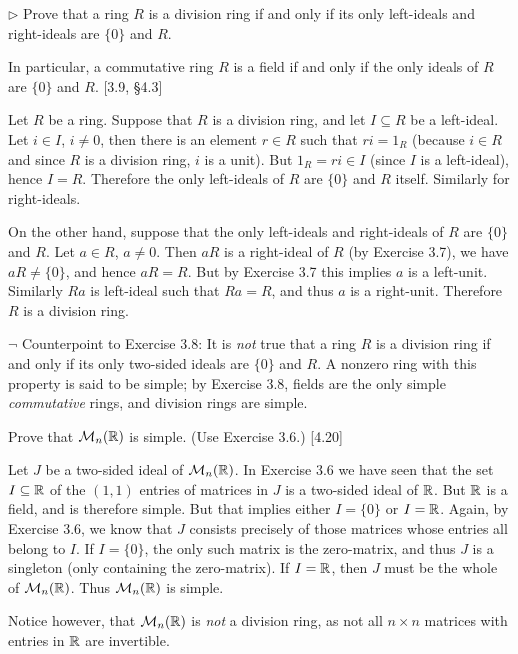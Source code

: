 \begin{problem}
	$\triangleright$ Prove that a ring $R$ is a division ring if and only if its only left-ideals and right-ideals are $\{0\}$ and $R$.
	
	In particular, a commutative ring $R$ is a field if and only if the only ideals of $R$ are $\{0\}$ and $R$. [3.9, \S 4.3]
\end{problem}

\begin{solution}
	Let $R$ be a ring. Suppose that $R$ is a division ring, and let $I \subseteq R$ be a left-ideal. Let $i \in I$, $i \neq 0$, then there is an element $r \in R$ such that $ri = 1_R$ (because $i \in R$ and since $R$ is a division ring, $i$ is a unit). But $1_R = ri \in I$ (since $I$ is a left-ideal), hence $I = R$. Therefore the only left-ideals of $R$ are $\{0\}$ and $R$ itself. Similarly for right-ideals.
	
	On the other hand, suppose that the only left-ideals and right-ideals of $R$ are $\{0\}$ and $R$. Let $a \in R$, $a \neq 0$. Then $aR$ is a right-ideal of $R$ (by Exercise 3.7), we have $aR \neq \{0\}$, and hence $aR = R$. But by Exercise 3.7 this implies $a$ is a left-unit. Similarly $Ra$ is left-ideal such that $Ra = R$, and thus $a$ is a right-unit. Therefore $R$ is a division ring.
\end{solution}

\begin{problem}
	$\neg$ Counterpoint to Exercise 3.8: It is \emph{not} true that a ring $R$ is a division ring if and only if its only two-sided ideals are $\{0\}$ and $R$. A nonzero ring with this property is said to be simple; by Exercise 3.8, fields are the only simple \emph{commutative} rings, and division rings are simple.
	
	Prove that $\mathcal{M}_n(\mathbb{R})$ is simple. (Use Exercise 3.6.) [4.20]
\end{problem}

\begin{solution}
	Let $J$ be a two-sided ideal of $\mathcal{M}_n(\mathbb{R})$. In Exercise 3.6 we have seen that the set $I \subseteq \mathbb{R}$ of the $(1,1)$ entries of matrices in $J$ is a two-sided ideal of $\mathbb{R}$. But $\mathbb{R}$ is a field, and is therefore simple. But that implies either $I = \{0\}$ or $I = \mathbb{R}$. Again, by Exercise 3.6, we know that $J$ consists precisely of those matrices whose entries all belong to $I$. If $I = \{0\}$, the only such matrix is the zero-matrix, and thus $J$ is a singleton (only containing the zero-matrix). If $I = \mathbb{R}$, then $J$ must be the whole of $\mathcal{M}_n(\mathbb{R})$. Thus $\mathcal{M}_n(\mathbb{R})$ is simple.
	
	Notice however, that $\mathcal{M}_n(\mathbb{R})$ is \emph{not} a division ring, as not all $n \times n$ matrices with entries in $\mathbb{R}$ are invertible.
\end{solution}

